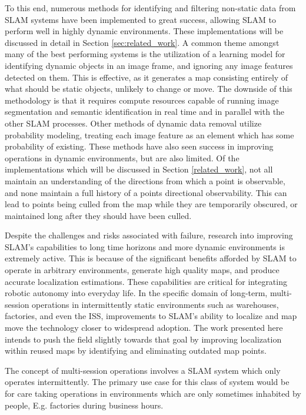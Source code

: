 To this end, numerous methods for identifying and filtering non-static data from SLAM systems have been implemented to great success, allowing SLAM to perform well in highly dynamic environments. These implementations will be discussed in detail in Section \ref{sec:related_work}. A common theme amongst many of the best performing systems is the utilization of a learning model for identifying dynamic objects in an image frame, and ignoring any image features detected on them. This is effective, as it generates a map consisting entirely of what should be static objects, unlikely to change or move. The downside of this methodology is that it requires compute resources capable of running image segmentation and semantic identification in real time and in parallel with the other SLAM processes. Other methods of dynamic data removal utilize probability modeling, treating each image feature as an element which has some probability of existing. These methods have also seen success in improving operations in dynamic environments, but are also limited. Of the implementations which will be discussed in Section \ref{related_work}, not all maintain an understanding of the directions from which a point is observable, and none maintain a full history of a points directional observability. This can lead to points being culled from the map while they are temporarily obscured, or maintained long after they should have been culled.


Despite the challenges and risks associated with failure, research into improving SLAM's capabilities to long time horizons and more dynamic environments is extremely active. This is because of the significant benefits afforded by SLAM to operate in arbitrary environments, generate high quality maps, and produce accurate localization estimations. These capabilities are critical for integrating robotic autonomy into everyday life. In the specific domain of long-term, multi-session operations in intermittently static environments such as warehouses, factories, and even the ISS, improvements to SLAM's ability to localize and map move the technology closer to widespread adoption.  The work presented here intends to push the field slightly towards that goal by improving localization within reused maps by identifying and eliminating outdated map points.


The concept of multi-session operations involves a SLAM system which only operates intermittently. The primary use case for this class of system would be for care taking operations in environments which are only sometimes inhabited by people, E.g. factories during business hours.


